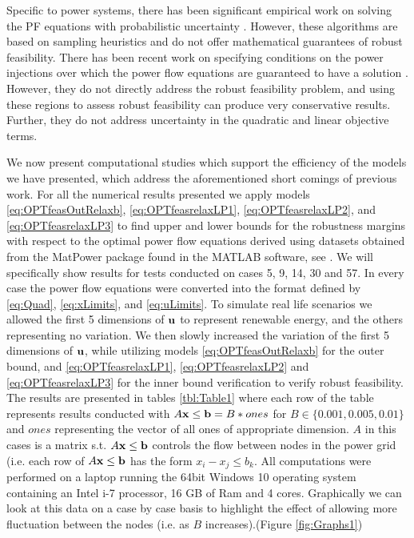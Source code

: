 \documentclass[11pt]{article}
\theoremstyle{plain}
\theoremstyle{definition}
\theoremstyle{remark}
\begin{document}
Specific to power systems, there has been significant empirical work on solving the PF equations with probabilistic uncertainty \cite{morales2007point,wang1992interval}.
However, these algorithms are based on sampling heuristics and do not offer mathematical guarantees of robust feasibility.
There has been recent work on specifying conditions on the power injections over which the power flow equations are guaranteed to have a solution \cite{bolognani2016existence,EPFLA,EPFLB}.
However, they do not directly address the robust feasibility problem, and using these regions to assess robust feasibility can produce very conservative results.
Further, they do not address uncertainty in the quadratic and linear objective terms.

We now present computational studies which support the efficiency of the models we have presented, which address the aforementioned short comings of previous work. 
For all the numerical results presented we apply models \eqref{eq:OPTfeasOutRelaxb}, \eqref{eq:OPTfeasrelaxLP1}, \eqref{eq:OPTfeasrelaxLP2}, and \eqref{eq:OPTfeasrelaxLP3} to find upper and lower bounds for the robustness margins with respect to the optimal power flow equations derived using datasets obtained from the MatPower package found in the MATLAB software, see \cite{matpower}. 
We will specifically show results for tests conducted on cases 5, 9, 14, 30 and 57. 
In every case the power flow equations were converted into the format defined by \eqref{eq:Quad}, \eqref{eq:xLimits}, and \eqref{eq:uLimits}. 
To simulate real life scenarios we allowed the first 5 dimensions of $\bold u$ to represent renewable energy, and the others representing no variation. We then slowly increased the variation of the first 5 dimensions of $\bold u$, while utilizing models \eqref{eq:OPTfeasOutRelaxb} for the outer bound, and \eqref{eq:OPTfeasrelaxLP1}, \eqref{eq:OPTfeasrelaxLP2} and \eqref{eq:OPTfeasrelaxLP3} for the inner bound verification to verify robust feasibility. 
The results are presented in tables \ref{tbl:Table1} where each row of the table represents results conducted with $A\bold x\leq \bold b = B*ones$ for $B\in\{0.001, 0.005,0.01\}$ and $ones$ representing the vector of all ones of appropriate dimension. 
$A$ in this cases is a matrix s.t. $A\bold x\leq \bold b$ controls the flow between nodes in the power grid (i.e. each row of $A\bold x\leq \bold b$ has the form $x_i-x_j\leq b_k$. 
All computations were performed on a laptop running the 64bit Windows 10 operating system containing an Intel i-7 processor, 16 GB of Ram and 4 cores. 
Graphically we can look at this data on a case by case basis to highlight the effect of allowing more fluctuation between the nodes (i.e. as $B$ increases).(Figure \ref{fig:Graphs1}) 
\end{document}
